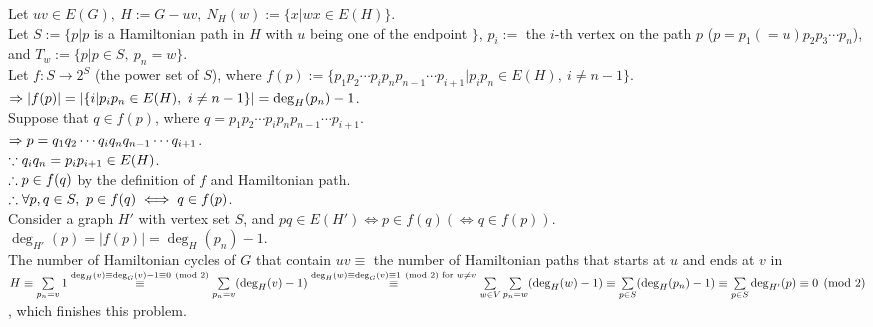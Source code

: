 \setcounter{pr}{1}
\begin{pr}
Let $uv\in E(G),\ H:=G-uv,\ N_H(w):=\{x|wx\in E(H)\}$.\\
Let $S:=\{p|p$ is a Hamiltonian path in $H$ with $u$ being one of the endpoint $\}$, $p_i:=$ the $i$-th vertex on the path $p$ ($p=p_1(=u)p_2p_3\cdots p_n$), and $T_w:=\{p|p\in S,\ p_n=w\}$.\\
Let $f:S\to2^S$ (the power set of $S$), where $f(p):=\{p_1p_2\cdots p_ip_np_{n-1}\cdots p_{i+1}|p_ip_n\in E(H),\ i\neq n-1\}$.\\
$\Rightarrow|f(p)|=|\{i|p_ip_n\in E(H),\ i\neq n-1\}|=\deg_H(p_n)-1$.\\
Suppose that $q\in f(p)$, where $q=p_1p_2\cdots p_ip_np_{n-1}\cdots p_{i+1}$.\\
$\Rightarrow p=q_1q_2\cdots q_iq_nq_{n-1}\cdots q_{i+1}$.\\
$\because q_iq_n=p_ip_{i+1}\in E(H)$.\\
$\therefore p\in f(q)$ by the definition of $f$ and Hamiltonian path.\\
$\therefore\forall p, q\in S,\ p\in f(q)\iff q\in f(p)$.\\
Consider a graph $H'$ with vertex set $S$, and $pq\in E(H')\iff p\in f(q)(\iff q\in f(p))$.\\
$\deg_{H'}(p)=|f(p)|=\deg_H(p_n)-1$.\\
The number of Hamiltonian cycles of $G$ that contain $uv\equiv$ the number of Hamiltonian paths that starts at $u$ and ends at $v$ in $H\equiv\sum\limits_{p_n=v}1\overset{\deg_H(v)\equiv\deg_G(v)-1\equiv0\pmod2}\equiv\sum\limits_{p_n=v}(\deg_H(v)-1)\overset{\deg_H(w)\equiv\deg_G(v)\equiv1\pmod2\text{ for }w\neq v}\equiv\sum\limits_{w\in V}\sum\limits_{p_n=w}(\deg_H(w)-1)\equiv\sum\limits_{p\in S}(\deg_H(p_n)-1)\equiv\sum\limits_{p\in S}\deg_{H'}(p)\equiv0\pmod2$, which finishes this problem.
\end{pr}
